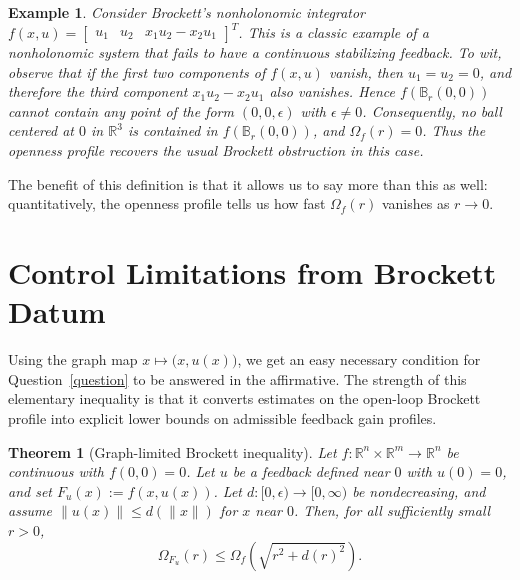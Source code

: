 \documentclass[pdflatex,sn-mathphys-num]{sn-jnl}%
\theoremstyle{thmstyleone}%
\newtheorem{theorem}{Theorem}%
\theoremstyle{thmstyletwo}%
\newtheorem{example}{Example}%
\theoremstyle{thmstylethree}%
\begin{document}
    \begin{example}\label{nonholonomic integrator example}
        Consider Brockett's nonholonomic integrator $f(x,u)=\begin{bmatrix} u_1 & u_2 & x_1u_2-x_2u_1 \end{bmatrix}^T$. This is a classic example of a nonholonomic system that fails to have a continuous stabilizing feedback. To wit, observe that if the first two components of $f(x,u)$ vanish, then $u_1=u_2=0$, and therefore the third component $x_1u_2-x_2u_1$ also vanishes.  Hence $f(\mathbb{B}_r(0,0))$ cannot contain any point of the form $(0,0,\epsilon)$ with $\epsilon\neq0$.  Consequently, no ball centered at $0$ in $\mathbb{R}^3$ is contained in $f(\mathbb{B}_r(0,0))$, and $\Omega_f(r)=0$.  Thus the openness profile recovers the usual Brockett obstruction in this case.
    \end{example}

    
    The benefit of this definition is that it allows us to say more than this as well:  quantitatively, the openness profile tells us how fast $\Omega_f(r)$ vanishes as $r\rightarrow 0$.


\section{Control Limitations from Brockett Datum}


Using the graph map $x \mapsto \big(x,u(x)\big)$, we get an easy necessary condition for Question~\ref{question} to be answered in the affirmative.  The strength of this elementary inequality is that it converts estimates on the open-loop Brockett profile into explicit lower bounds on admissible feedback gain profiles.

    
    \begin{theorem}[Graph-limited Brockett inequality]\label{graph limited brocket inequality}
        Let $f:\mathbb{R}^n\times\mathbb{R}^m\to\mathbb{R}^n$ be continuous with $f(0,0)=0$. Let $u$ be a feedback defined near $0$ with $u(0)=0$, and set $F_u(x):=f(x,u(x))$.  Let $d:[0,\epsilon)\to[0,\infty)$ be nondecreasing, and assume $\|u(x)\|\leq d(\|x\|)$ for $x$ near $0$.  Then, for all sufficiently small $r>0$, 
        \[
            \Omega_{F_u}(r) \leq \Omega_f\left(\sqrt{r^2+d(r)^2}\right).
        \]
    \end{theorem}
\end{document}

